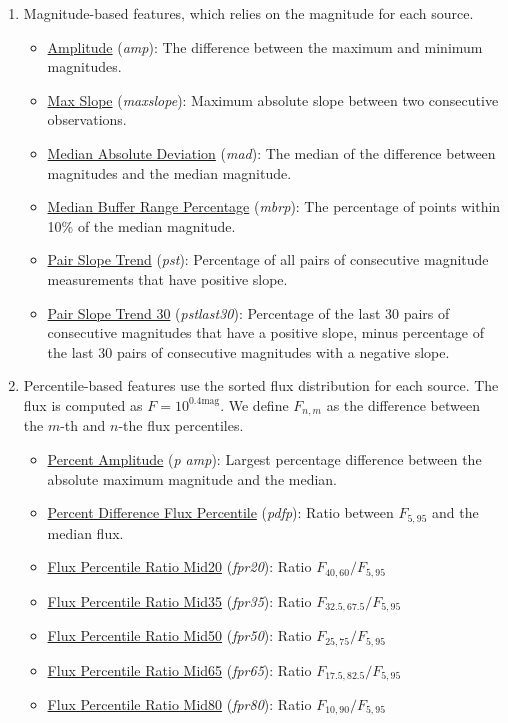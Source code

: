 \documentclass[a4paper,fleqn,usenatbib]{mnras}
\begin{document}
\begin{enumerate}
    \item Magnitude-based features, which relies on the magnitude for each source.
    \begin{itemize}
    \item \underline{Amplitude} (\textit{amp}): 
      The difference between the maximum and minimum magnitudes.
    \item \underline{Max Slope} (\textit{max\textunderscore slope}): 
      Maximum absolute slope between two consecutive observations.
    \item \underline{Median Absolute Deviation} (\textit{mad}): 
      The median of the difference between magnitudes and the median
      magnitude. 
    \item \underline{Median Buffer Range Percentage} (\textit{mbrp}): 
      The percentage of points within 10\% of the median magnitude.
    \item \underline{Pair Slope Trend} (\textit{pst}): 
      Percentage of all pairs of consecutive magnitude measurements that have positive slope.
    \item \underline{Pair Slope Trend 30} (\textit{pst\textunderscore last30}): 
      Percentage of the last 30 pairs of consecutive magnitudes that have a positive slope, minus percentage of the last 30 pairs of consecutive magnitudes with a negative slope.
    \end{itemize}


  \item Percentile-based features use the sorted flux distribution for
    each source. The flux is computed as $F = 10^{0.4 \mathrm{mag}}$. 
    We define $F_{n,m}$ as the difference between the $m$-th and $n$-the flux
    percentiles. 
    \begin{itemize}
    \item \underline{Percent Amplitude} (\textit{p \textunderscore amp}): 
      Largest percentage difference between the absolute maximum magnitude and the median.
    \item \underline{Percent Difference Flux Percentile} (\textit{pdfp}): 
      Ratio between $F_{5,95}$ and the median flux.
    \item \underline{Flux Percentile Ratio Mid20} (\textit{fpr20}): 
      Ratio $F_{40,60} / F_{5,95}$
    \item \underline{Flux Percentile Ratio Mid35} (\textit{fpr35}):
        Ratio $F_{32.5,67.5} / F_{5,95}$
      \item \underline{Flux Percentile Ratio Mid50} (\textit{fpr50}): 
        Ratio $F_{25,75} / F_{5,95}$
      \item \underline{Flux Percentile Ratio Mid65} (\textit{fpr65}): 
        Ratio $F_{17.5,82.5} / F_{5,95}$
      \item \underline{Flux Percentile Ratio Mid80} (\textit{fpr80}): 
        Ratio $F_{10,90} / F_{5,95}$
    \end{itemize}
    

\end{enumerate}
\end{document}
